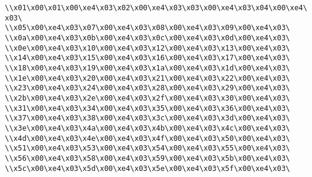 \verb|\\x01\x00\x01\x00\xe4\x03\x02\x00\xe4\x03\x03\x00\xe4\x03\x04\x00\xe4\x03\|\newline
\verb|\\x05\x00\xe4\x03\x07\x00\xe4\x03\x08\x00\xe4\x03\x09\x00\xe4\x03\|\newline
\verb|\\x0a\x00\xe4\x03\x0b\x00\xe4\x03\x0c\x00\xe4\x03\x0d\x00\xe4\x03\|\newline
\verb|\\x0e\x00\xe4\x03\x10\x00\xe4\x03\x12\x00\xe4\x03\x13\x00\xe4\x03\|\newline
\verb|\\x14\x00\xe4\x03\x15\x00\xe4\x03\x16\x00\xe4\x03\x17\x00\xe4\x03\|\newline
\verb|\\x18\x00\xe4\x03\x19\x00\xe4\x03\x1a\x00\xe4\x03\x1d\x00\xe4\x03\|\newline
\verb|\\x1e\x00\xe4\x03\x20\x00\xe4\x03\x21\x00\xe4\x03\x22\x00\xe4\x03\|\newline
\verb|\\x23\x00\xe4\x03\x24\x00\xe4\x03\x28\x00\xe4\x03\x29\x00\xe4\x03\|\newline
\verb|\\x2b\x00\xe4\x03\x2e\x00\xe4\x03\x2f\x00\xe4\x03\x30\x00\xe4\x03\|\newline
\verb|\\x31\x00\xe4\x03\x34\x00\xe4\x03\x35\x00\xe4\x03\x36\x00\xe4\x03\|\newline
\verb|\\x37\x00\xe4\x03\x38\x00\xe4\x03\x3c\x00\xe4\x03\x3d\x00\xe4\x03\|\newline
\verb|\\x3e\x00\xe4\x03\x4a\x00\xe4\x03\x4b\x00\xe4\x03\x4c\x00\xe4\x03\|\newline
\verb|\\x4d\x00\xe4\x03\x4e\x00\xe4\x03\x4f\x00\xe4\x03\x50\x00\xe4\x03\|\newline
\verb|\\x51\x00\xe4\x03\x53\x00\xe4\x03\x54\x00\xe4\x03\x55\x00\xe4\x03\|\newline
\verb|\\x56\x00\xe4\x03\x58\x00\xe4\x03\x59\x00\xe4\x03\x5b\x00\xe4\x03\|\newline
\verb|\\x5c\x00\xe4\x03\x5d\x00\xe4\x03\x5e\x00\xe4\x03\x5f\x00\xe4\x03\|\newline
